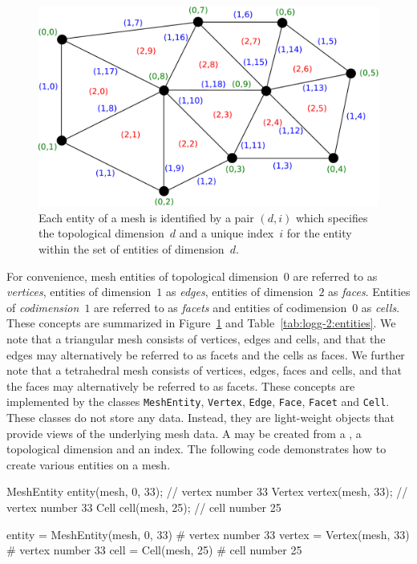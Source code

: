 \begin{figure}
  \centering
  \includegraphics[width=\largefig]{chapters/logg-2/pdf/mesh-p1-entities.pdf}
  \caption{Each entity of a mesh is identified by a pair $(d, i)$
    which specifies the topological dimension~$d$ and a unique
    index~$i$ for the entity within the set of entities of
    dimension~$d$.}
  \label{fig:logg-2:entities}
\end{figure}

For convenience, mesh entities of topological dimension~$0$ are
referred to as \emph{vertices}, entities of dimension~$1$ as
\emph{edges}, entities of dimension~$2$ as \emph{faces}. Entities of
\emph{codimension}~$1$ are referred to as \emph{facets} and entities
of codimension~$0$ as \emph{cells}. These concepts are summarized in
Figure~\ref{fig:logg-2:entities} and
Table~\ref{tab:logg-2:entities}. We note that a triangular mesh
consists of vertices, edges and cells, and that the edges may
alternatively be referred to as facets and the cells as faces. We
further note that a tetrahedral mesh consists of vertices, edges,
faces and cells, and that the faces may alternatively be referred to
as facets. These concepts are implemented by the classes
\texttt{MeshEntity}, \texttt{Vertex}, \texttt{Edge}, \texttt{Face},
\texttt{Facet} and \texttt{Cell}. These classes do not store any
data. Instead, they are light-weight objects that provide views of the
underlying mesh data. A  may be created from a
, a topological dimension and an index. The following code
demonstrates how to create various entities on a mesh.
\begin{c++}
MeshEntity entity(mesh, 0, 33); // vertex number 33
Vertex vertex(mesh, 33);        // vertex number 33
Cell cell(mesh, 25);            // cell number 25
\end{c++}
\begin{python}
entity = MeshEntity(mesh, 0, 33) # vertex number 33
vertex = Vertex(mesh, 33)        # vertex number 33
cell = Cell(mesh, 25)            # cell number 25
\end{python}

